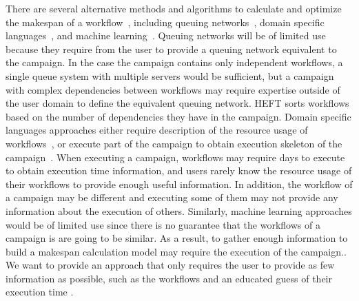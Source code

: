 There are several alternative methods and algorithms to calculate and optimize the makespan of a workflow~\cite{lu2019review}, including queuing networks~\cite{yao2019throughput,bao2019performance}, domain specific languages~\cite{carothers2017durango,maheshwari2016workflow}, and machine learning~\cite{witt2019predictive,pumma2017runtime}.
Queuing networks will be of limited use because they require from the user to provide a queuing network equivalent to the campaign.
In the case the campaign contains only independent workflows, a single queue system with multiple servers would be sufficient, but a campaign with complex dependencies between workflows may require expertise outside of the user domain to define the equivalent queuing network.
HEFT sorts workflows based on the number of dependencies they have in the campaign.
Domain specific languages approaches either require description of the resource usage of workflows~\cite{carothers2017durango}, or execute part of the campaign to obtain execution skeleton of the campaign~\cite{maheshwari2016workflow}.
When executing a campaign, workflows may require days to execute to obtain execution time information, and users rarely know the resource usage of their workflows to provide enough useful information.
In addition, the workflow of a campaign may be different and executing some of them may not provide any information about the execution of others.
Similarly, machine learning approaches would be of limited use since there is no guarantee that the workflows of a campaign is are going to be similar.
As a result, to gather enough information to build a makespan calculation model may require the execution of the campaign..
We want to provide an approach that only requires the user to provide as few information as possible, such as the workflows and an educated guess of their execution time  .


